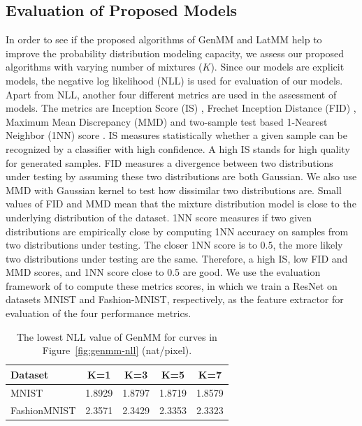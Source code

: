 \subsection{Evaluation of Proposed Models}\label{chpt6:sec:eval-metrics}
In order to see if the proposed algorithms of GenMM and LatMM help to improve the probability distribution modeling capacity, we assess our proposed algorithms with varying number of mixtures ($K$). Since our models are explicit models, the negative log likelihood (NLL) is used for evaluation of our models. Apart from NLL, another four different metrics are used in the assessment of models.
The metrics are Inception Score (IS) \cite{NIPS2016_6125,2018arXiv180101973B,2018arXiv180607755X}, Frechet
Inception Distance (FID) \cite{2017arXiv170608500H}, Maximum Mean
Discrepancy (MMD) \cite{2018arXiv180607755X} and two-sample test based 1-Nearest
Neighbor (1NN) score \cite{2016arXiv161006545L}. IS measures statistically whether a given sample can be recognized by a classifier with high confidence. A high IS stands for high quality for generated samples. FID measures a divergence between two distributions under testing by assuming these two distributions are both Gaussian. We also use MMD with Gaussian kernel to test how dissimilar two distributions are.
Small values of FID and MMD mean that the mixture distribution model
is close to the underlying distribution of the dataset. 1NN score measures
if two given distributions are empirically close by computing 1NN accuracy
on samples from two distributions under testing. The closer 1NN score is to $0.5$, the more likely 
two distributions under testing are the same. Therefore, a high IS, low FID and MMD scores, and 1NN score close to 0.5 are good. We use the evaluation
framework of \cite{2018arXiv180607755X} to compute these metrics scores, in which
we train a ResNet on datasets MNIST and Fashion-MNIST, respectively, as the feature extractor for evaluation of the four performance metrics.



\begin{table}
  \caption{The lowest NLL value of GenMM for curves in Figure~\ref{fig:genmm-nll} (nat/pixel).}
  \label{tab:lowestNLLgenMM}
   \centering
  \begin{tabular}{lcccc}
    \toprule
    {Dataset} & K=1 &  K=3 &  K=5 &  K=7 \\                                         
    \midrule                                                                                          MNIST &     1.8929 &    1.8797 &    1.8719 &    1.8579 \\
    FashionMNIST &   2.3571 &   2.3429 &   2.3353 &   2.3323 \\
    \bottomrule
  \end{tabular} 
\end{table}

